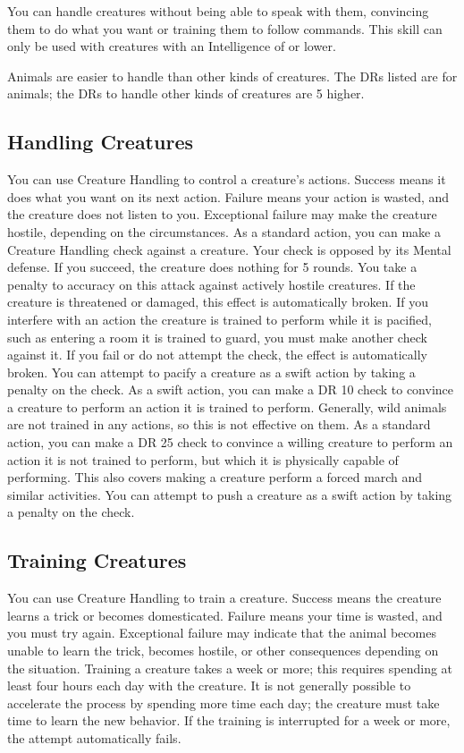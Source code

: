         You can handle creatures without being able to speak with them, convincing them to do what you want or training them to follow commands. This skill can only be used with creatures with an Intelligence of  or lower.

        Animals are easier to handle than other kinds of creatures. The DRs listed are for animals; the DRs to handle other kinds of creatures are 5 higher.

    \subsection{Handling Creatures}
        You can use Creature Handling to control a creature's actions. Success means it does what you want on its next action. Failure means your action is wasted, and the creature does not listen to you. Exceptional failure may make the creature hostile, depending on the circumstances.
         As a standard action, you can make a Creature Handling check against a creature. Your check is opposed by its Mental defense. If you succeed, the creature does nothing for 5 rounds. You take a  penalty to accuracy on this attack against actively hostile creatures. If the creature is threatened or damaged, this effect is automatically broken. If you interfere with an action the creature is trained to perform while it is pacified, such as entering a room it is trained to guard, you must make another check against it. If you fail or do not attempt the check, the effect is automatically broken. You can attempt to pacify a creature as a swift action by taking a  penalty on the check.
         As a swift action, you can make a DR 10 check to convince a creature to perform an action it is trained to perform. Generally, wild animals are not trained in any actions, so this is not effective on them.
         As a standard action, you can make a DR 25 check to convince a willing creature to perform an action it is not trained to perform, but which it is physically capable of performing. This also covers making a creature perform a forced march and similar activities. You can attempt to push a creature as a swift action by taking a  penalty on the check.

    \subsection{Training Creatures}
        You can use Creature Handling to train a creature. Success means the creature learns a trick or becomes domesticated. Failure means your time is wasted, and you must try again. Exceptional failure may indicate that the animal becomes unable to learn the trick, becomes hostile, or other consequences depending on the situation. Training a creature takes a week or more; this requires spending at least four hours each day with the creature. It is not generally possible to accelerate the process by spending more time each day; the creature must take time to learn the new behavior. If the training is interrupted for a week or more, the attempt automatically fails.

